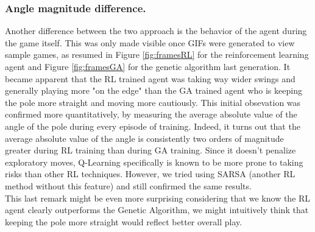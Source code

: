 \subsubsection{Angle magnitude difference.}
Another difference between the two approach is the behavior of the agent during the game itself.
This was only made visible once GIFs were generated to view sample games, as resumed in Figure \ref{fig:framesRL} for the reinforcement learning agent and Figure \ref{fig:framesGA} for the genetic algorithm last generation. 
It became apparent that the RL trained agent was taking way wider swings and generally playing more "on the edge" than the GA trained agent who is keeping the pole more straight and moving more cautiously.
This initial obsevation was confirmed more quantitatively, by measuring the average absolute value of the angle of the pole during every episode of training.
Indeed, it turns out that the average absolute value of the angle is consistently two orders of magnitude greater during RL training than during GA training.
Since it doesn't penalize exploratory moves, Q-Learning specifically is known to be more prone to taking risks than other RL techniques. However, we tried using SARSA (another RL method without this feature) and still confirmed the same results.
\\
This last remark might be even more surprising considering that we know the RL agent clearly outperforms the Genetic Algorithm, we might intuitively think that keeping the pole more straight would reflect better overall play.



